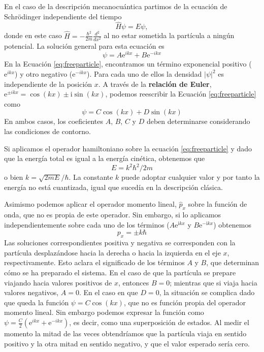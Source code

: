 \documentclass{tufte-handout}
\begin{document}
En el caso de la descripción mecanocuántica partimos de 
la ecuación de Schrödinger independiente del tiempo
\begin{equation}
    \hat{H}\psi=E\psi,
\end{equation}
donde en este caso $\hat{H}=-\frac{\hbar^2}{2m}\frac{d^2}{dx^2}$ al
no estar sometida la partícula a ningún potencial. La solución
general para esta ecuación es
\begin{equation}
    \psi = A\mathrm{e}^{ikx}+ B\mathrm{e}^{-ikx}\label{eq:freeparticle}
\end{equation}
En la Ecuación \ref{eq:freeparticle}, encontramos un término
exponencial positivo ($\mathrm{e}^{ikx}$) y otro negativo 
($\mathrm{e}^{-ikx}$). Para cada uno de ellos la densidad 
$|\psi|^2$ es independiente de la posición $x$.
A través de la \textbf{relación de Euler}, 
$\mathrm{e}^{\pm ikx}=\cos(kx)\pm\mathrm{i}\sin(kx)$, podemos reescribir
la Ecuación \ref{eq:freeparticle} como
\begin{equation}
    \psi=C\cos(kx) + D\sin(kx) \label{eq:freepangular}
\end{equation}
En ambos casos, los coeficientes
$A$, $B$, $C$ y $D$ deben determinarse considerando las condiciones
de contorno.

Si aplicamos el operador hamiltoniano sobre la ecuación 
\ref{eq:freeparticle} y dado que la energía total es igual
a la energía cinética, obtenemos que 
\begin{equation}
E=k^2\hbar^2/2m
\end{equation}
o bien $k=\sqrt{2mE}/\hbar$. La constante $k$ puede adoptar
cualquier valor y por tanto la energía no está cuantizada,
igual que sucedía en la descripción clásica. 

Asimismo podemos aplicar el operador momento lineal, 
$\hat{p}_x$ sobre la función de onda, que no es propia
de este operador. Sin embargo, si lo aplicamos 
independientemente sobre cada uno de los términos
($A\mathrm{e}^{\mathrm{i}kx}$ y $B\mathrm{e}^{-\mathrm{i}kx}$)
obtenemos
\begin{equation}
    p_x = \pm k\hbar
\end{equation}
Las soluciones correspondientes positiva y negativa 
se corresponden con la partícula desplazándose
hacia la derecha o hacia la izquierda en el eje $x$, 
respectivamente. Esto aclara el significado de los 
términos $A$ y $B$, que determinan cómo se ha preparado 
el sistema. En el caso de que la partícula se prepare 
viajando hacia valores positivos de $x$, entonces $B=0$; 
mientras que si viaja hacia valores negativos, $A=0$. 
En el caso en que
$D=0$, la situación se complica dado que queda la función
$\psi=C\cos(kx)$, que no es función propia del operador
momento lineal. Sin embargo podemos expresar la función como
$\psi=\frac{C}{2}(\mathrm{e}^{ikx}+\mathrm{e}^{-ikx})$,
es decir, como una superposición de estados. Al medir el
momento la mitad de las veces obtendríamos que la partícula
viaja en sentido positivo y la otra mitad en sentido
negativo, y que el valor esperado sería cero.
\end{document}
